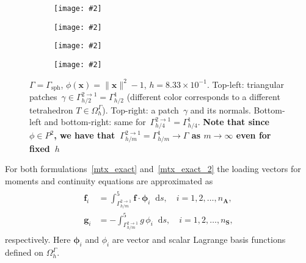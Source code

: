 \documentclass[12pt]{article}
\newcommand{\includegraphicsw}[2][1.]{\texttt{[image: \#2]}}
\newcommand{\vect}[1]{\boldsymbol{\mathbf{#1}}}
\newcommand*\diff{\mathop{}\!\mathrm{d}}
\newcommand{\sphere}{{\Gamma_{\text{sph}}}}
\begin{document}
\begin{figure}[H]
	\par\bigskip
	\centering
	\begin{subfigure}{.5\linewidth}
		\centering
		\includegraphicsw[.45]{patches_2.png}
	\end{subfigure}%
	\begin{subfigure}{.5\linewidth}
		\centering
		\includegraphicsw[.45]{normals_2.png}
	\end{subfigure}%
	\par\bigskip
	\begin{subfigure}{.5\linewidth}
		\centering
		\includegraphicsw[.45]{patches_4.png}
	\end{subfigure}%
	\begin{subfigure}{.5\linewidth}
		\centering
		\includegraphicsw[.45]{normals_4.png}
	\end{subfigure}%
	\par\bigskip
	\caption{$\Gamma = \sphere$, $\phi(\vect x) = \|\vect x\|^2 - 1$, $h = 8.33\times10^{-1}$. Top-left: triangular patches~$\gamma \in \Gamma_{h/2}^{2 \rightarrow 1} = \Gamma_{h/2}^1$ (different color corresponds to a different tetrahedron $T \in \Omega^\Gamma_h$). Top-right: a patch~$\gamma$ and its normals. Bottom-left and bottom-right: same for~$\Gamma_{h/4}^{2 \rightarrow 1} = \Gamma_{h/4}^1$. \textbf{Note that since~$\phi \in P^2$, we have that~$\Gamma_{h/m}^{2 \rightarrow 1} = \Gamma_{h/m}^1 \rightarrow \Gamma$ as $m \rightarrow \infty$ even for fixed~$h$}}
	\label{fig:phi_exact}		
\end{figure}

For both formulations~\eqref{mtx_exact} and~\eqref{mtx_exact_2} the loading vectors for moments and continuity equations are approximated as
\begin{align}\begin{split}\label{rhs}
	\vect f_i &= \int_{\Gamma_{h/m}^{2 \to 1}}^5 \vect f \cdot \vect \phi_i \diff{s}, \quad i = 1, 2, \dots, n_{\vect A}, \\
	\vect g_i &= -\int_{\Gamma_{h/m}^{2 \to 1}}^5 g\,\phi_i \diff{s}, \quad i = 1, 2, \dots, n_{\vect S},
\end{split}\end{align}
respectively. Here $\vect \phi_i$ and $\phi_i$ are vector and scalar Lagrange basis functions defined on $\Omega_h^\Gamma$.
 
\end{document}
